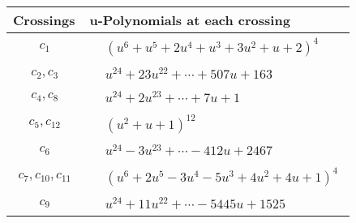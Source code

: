 \documentclass[1p]{elsarticle_modified}
\theoremstyle{definition}
\begin{document}
\begin{tabular}{m{50pt}|m{274pt}}
Crossings & \hspace{64pt}u-Polynomials at each crossing \\
\hline $$\begin{aligned}c_{1}\end{aligned}$$&$\begin{aligned}
&(u^6+u^5+2 u^4+u^3+3 u^2+u+2)^4
\end{aligned}$\\
\hline $$\begin{aligned}c_{2},c_{3}\end{aligned}$$&$\begin{aligned}
&u^{24}+23 u^{22}+\cdots+507 u+163
\end{aligned}$\\
\hline $$\begin{aligned}c_{4},c_{8}\end{aligned}$$&$\begin{aligned}
&u^{24}+2 u^{23}+\cdots+7 u+1
\end{aligned}$\\
\hline $$\begin{aligned}c_{5},c_{12}\end{aligned}$$&$\begin{aligned}
&(u^2+u+1)^{12}
\end{aligned}$\\
\hline $$\begin{aligned}c_{6}\end{aligned}$$&$\begin{aligned}
&u^{24}-3 u^{23}+\cdots-412 u+2467
\end{aligned}$\\
\hline $$\begin{aligned}c_{7},c_{10},c_{11}\end{aligned}$$&$\begin{aligned}
&(u^6+2 u^5-3 u^4-5 u^3+4 u^2+4 u+1)^4
\end{aligned}$\\
\hline $$\begin{aligned}c_{9}\end{aligned}$$&$\begin{aligned}
&u^{24}+11 u^{22}+\cdots-5445 u+1525
\end{aligned}$\\
\hline
\end{tabular}\\~\\
\newpage\renewcommand{\arraystretch}{1}
\end{document}
